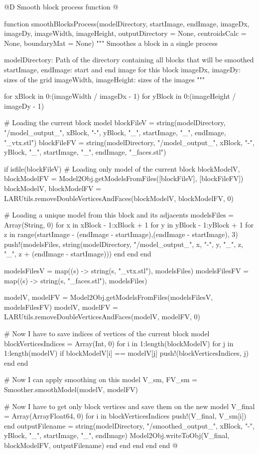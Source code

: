 \documentclass[11pt,oneside]{article}	%
\begin{document}
@D Smooth block process function
@{function smoothBlocksProcess(modelDirectory,
			      startImage, endImage,
			      imageDx, imageDy,
			      imageWidth, imageHeight,
			      outputDirectory = None,
			      centroidsCalc = None, boundaryMat = None)
  """
  Smoothes a block in a single process

  modelDirectory: Path of the directory containing all blocks
                  that will be smoothed
  startImage, endImage: start and end image for this block
  imageDx, imageDy: sizes of the grid
  imageWidth, imageHeight: sizes of the images
  """

  for xBlock in 0:(imageWidth / imageDx - 1)
    for yBlock in 0:(imageHeight / imageDy - 1)

      # Loading the current block model
      blockFileV = string(modelDirectory, "/model_output_", xBlock, "-", yBlock,
			  "_", startImage, "_", endImage, "_vtx.stl")
      blockFileFV = string(modelDirectory, "/model_output_", xBlock, "-", yBlock,
			  "_", startImage, "_", endImage, "_faces.stl")

      if isfile(blockFileV)
        # Loading only model of the current block
        blockModelV, blockModelFV = Model2Obj.getModelsFromFiles([blockFileV], [blockFileFV])
        blockModelV, blockModelFV = LARUtils.removeDoubleVerticesAndFaces(blockModelV,
						blockModelFV, 0)

        # Loading a unique model from this block and its adjacents
        modelsFiles = Array(String, 0)
        for x in xBlock - 1:xBlock + 1
          for y in yBlock - 1:yBlock + 1
            for z in range(startImage - (endImage - startImage),(endImage - startImage), 3)
              push!(modelsFiles, string(modelDirectory, "/model_output_",
					x, "-", y, "_", z, "_", z + (endImage - startImage)))
            end
          end
        end

        modelsFilesV = map((s) -> string(s, "_vtx.stl"), modelsFiles)
        modelsFilesFV = map((s) -> string(s, "_faces.stl"), modelsFiles)

        modelV, modelFV = Model2Obj.getModelsFromFiles(modelsFilesV, modelsFilesFV)
        modelV, modelFV = LARUtils.removeDoubleVerticesAndFaces(modelV, modelFV, 0)

        # Now I have to save indices of vertices of the current block model
        blockVerticesIndices = Array(Int, 0)
        for i in 1:length(blockModelV)
          for j in 1:length(modelV)
            if blockModelV[i] == modelV[j]
              push!(blockVerticesIndices, j)
            end
          end

          # Now I can apply smoothing on this model
          V_sm, FV_sm = Smoother.smoothModel(modelV, modelFV)

          # Now I have to get only block vertices and save them on the new model
          V_final = Array(Array{Float64}, 0)
          for i in blockVerticesIndices
            push!(V_final, V_sm[i])
          end
          outputFilename = string(modelDirectory, "/smoothed_output_", xBlock, "-",
				  yBlock, "_", startImage, "_", endImage)
          Model2Obj.writeToObj(V_final, blockModelFV, outputFilename)
        end
      end
    end
  end
end @}
\end{document}
